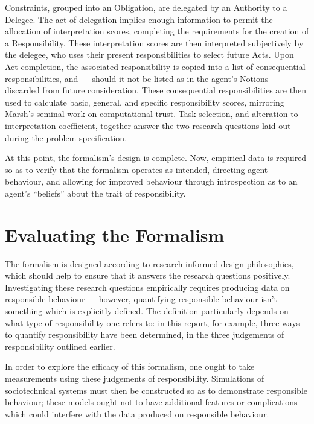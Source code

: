 Constraints, grouped into an Obligation, are delegated by an Authority to a Delegee. The act of delegation implies enough information to permit the allocation of interpretation scores, completing the requirements for the creation of a Responsibility. These interpretation scores are then interpreted subjectively by the delegee, who uses their present responsibilities to select future Acts. Upon Act completion, the associated responsibility is copied into a list of consequential responsibilities, and --- should it not be listed as in the agent's Notions --- discarded from future consideration. These consequential responsibilities are then used to calculate basic, general, and specific responsibility scores, mirroring Marsh's seminal work on computational trust. Task selection, and alteration to interpretation coefficient, together answer the two research questions laid out during the problem specification.\par

At this point, the formalism's design is complete. Now, empirical data is required so as to verify that the formalism operates as intended, directing agent behaviour, and allowing for improved behaviour through introspection as to an agent's ``beliefs'' about the trait of responsibility.\par

\section{Evaluating the Formalism}
The formalism is designed according to research-informed design philosophies, which should help to ensure that it answers the research questions positively. Investigating these research questions empirically requires producing data on responsible behaviour --- however, quantifying responsible behaviour isn't something which is explicitly defined. The definition particularly depends on what type of responsibility one refers to: in this report, for example, three ways to quantify responsibility have been determined, in the three judgements of responsibility outlined earlier.\par

In order to explore the efficacy of this formalism, one ought to take measurements using these judgements of responsibility. Simulations of sociotechnical systems must then be constructed so as to demonstrate responsible behaviour; these models ought not to have additional features or complications which could interfere with the data produced on responsible behaviour.\par

